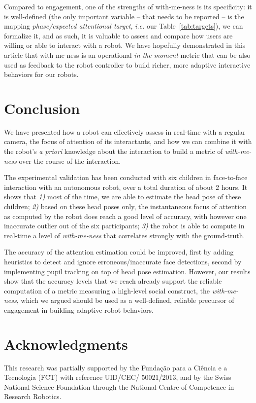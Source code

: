 \documentclass{sig-alternate}
\newcommand{\ie}{\textit{i.e.}\xspace}
\begin{document}
Compared to engagement, one of the strengths of with-me-ness is its specificity:
it is well-defined (the only important variable -- that needs to be reported --
is the mapping {\it phase/expected attentional target}, \ie our
Table~\ref{tab:targets}), we can formalize it, and as such, it is valuable to
assess and compare how users are willing or able to interact with a robot.  We
have hopefully demonstrated in this article that with-me-ness is an operational
\emph{in-the-moment} metric that can be also used as feedback to the robot
controller to build richer, more adaptive interactive behaviors for our robots.

\section{Conclusion}

We have presented how a robot can effectively assess in real-time with a regular
camera, the focus of attention of its interactants, and how we can combine it
with the robot's {\it a priori} knowledge about the interaction to build a
metric of \emph{with-me-ness} over the course of the interaction.

The experimental validation has been conducted with six children in face-to-face
interaction with an autonomous robot, over a total duration of about 2 hours. It
shows that {\it 1)} most of the time, we are able to estimate the head pose of
these children; {\it 2)} based on these head poses only, the instantaneous focus
of attention as computed by the robot does reach a good level of accuracy, with
however one inaccurate outlier out of the six participants; {\it 3)} the robot is
able to compute in real-time a level of \emph{with-me-ness} that correlates
strongly with the ground-truth.

The accuracy of the attention estimation could be improved, first by adding
heuristics to detect and ignore erroneous/inaccurate face detections, second by
implementing pupil tracking on top of head pose estimation. However, our results
show that the accuracy levels that we reach already support the reliable
computation of a metric measuring a high-level social construct, the
\emph{with-me-ness}, which we argued should be used as a well-defined, reliable
precursor of engagement in building adaptive robot behaviors.

\section*{Acknowledgments}

This research was partially supported by the Funda\c{c}\~{a}o para a Ci\^{e}ncia
e a Tecnologia (FCT) with reference UID/CEC/ 50021/2013, and by the Swiss
National Science Foundation through the National Centre of Competence in
Research Robotics.



\end{document}
